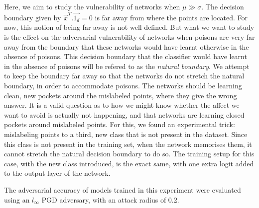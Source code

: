 \documentclass{ociamthesis}
\begin{document}
Here, we aim to study the vulnerability of networks when $\mu \gg \sigma$. The
decision boundary given by $\vec{x}^T.\vec{1_d} = 0$ is far away from where the
points are located. For now, this notion of being far away is not well defined.
But what we want to study is the effect on the adversarial vulnerability of
networks when poisons are very far away from the boundary that these networks
would have learnt otherwise in the absence of poisons. This decision boundary
that the classifier would have learnt in the absence of poisons will be refered
to as the \emph{natural boundary}. We attempt to keep the boundary far away so
that the networks do not stretch the natural boundary, in order to accommodate
poisons. The networks should be learning clean, new pockets around the
mislabeled points, where they give the wrong answer. It is a valid question as
to how we might know whether the affect we want to avoid is actually not
happening, and that networks are learning closed pockets around mislabeled
points. For this, we found an experimental trick: mislabeling points to a third,
new class that is not present in the dataset. Since this class is not present in
the training set, when the network memorises them, it cannot stretch the natural
decision boundary to do so. The training setup for this case, with the new class
introduced, is the exact same, with one extra logit added to the output layer of
the network.

The adversarial accuracy of models trained in this experiment were evaluated
using an $l_\infty$ PGD adversary, with an attack radius of 0.2.
\end{document}
